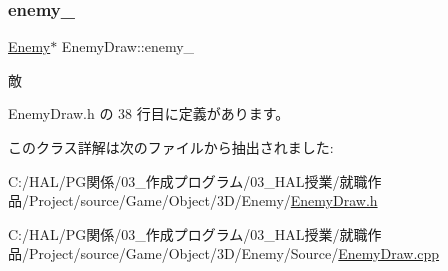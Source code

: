 \subsubsection{\texorpdfstring{enemy\+\_\+}{enemy\_}}
{\footnotesize\ttfamily \mbox{\hyperlink{class_enemy}{Enemy}}$\ast$ Enemy\+Draw\+::enemy\+\_\+\hspace{0.3cm}{\ttfamily [private]}}



敵 



 Enemy\+Draw.\+h の 38 行目に定義があります。



このクラス詳解は次のファイルから抽出されました\+:\begin{DoxyCompactItemize}
\item 
C\+:/\+H\+A\+L/\+P\+G関係/03\+\_\+作成プログラム/03\+\_\+\+H\+A\+L授業/就職作品/\+Project/source/\+Game/\+Object/3\+D/\+Enemy/\mbox{\hyperlink{_enemy_draw_8h}{Enemy\+Draw.\+h}}\item 
C\+:/\+H\+A\+L/\+P\+G関係/03\+\_\+作成プログラム/03\+\_\+\+H\+A\+L授業/就職作品/\+Project/source/\+Game/\+Object/3\+D/\+Enemy/\+Source/\mbox{\hyperlink{_enemy_draw_8cpp}{Enemy\+Draw.\+cpp}}\end{DoxyCompactItemize}
